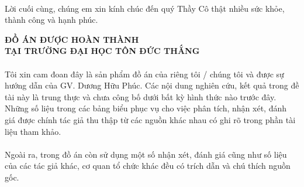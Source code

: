 \documentclass{report}
\begin{document}
	\paragraph{}
	Lời cuối cùng, chúng em xin kính chúc đến quý Thầy Cô thật nhiều sức khỏe, thành công và hạnh phúc.
\pagebreak	
\begin{center}
	\fontsize{16}{20}\selectfont
	\textbf{ĐỒ ÁN ĐƯỢC HOÀN THÀNH}\\
	\textbf{TẠI TRƯỜNG ĐẠI HỌC TÔN ĐỨC THẮNG\\} 
\end{center}
\fontsize{13}{15}\selectfont
\paragraph{}
Tôi xin cam đoan đây là sản phẩm đồ án của riêng tôi / chúng tôi và được sự hướng dẫn của GV. Dương Hữu Phúc. Các nội dung nghiên cứu, kết quả trong đề tài này là trung thực và chưa công bố dưới bất kỳ hình thức nào trước đây. Những số liệu trong các bảng biểu phục vụ cho việc phân tích, nhận xét, đánh giá được chính tác giả thu thập từ các nguồn khác nhau có ghi rõ trong phần tài liệu tham khảo.
\paragraph{}
Ngoài ra, trong đồ án còn sử dụng một số nhận xét, đánh giá cũng như số liệu của các tác giả khác, cơ quan tổ chức khác đều có trích dẫn và chú thích nguồn gốc.
\end{document}
